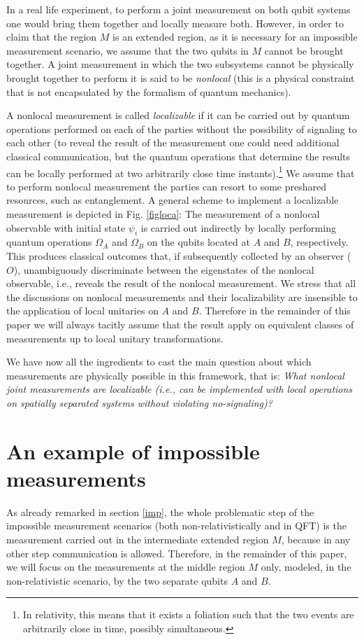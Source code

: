 \documentclass[a4paper,twocolumn,11pt,accepted=2024-02-14]{quantumarticle}
\begin{document}
In a real life experiment, to perform a joint measurement on both qubit systems one would bring them together and locally measure both. However,  in order to claim that the region $M$   is an extended region, as it is necessary for an impossible measurement scenario, we assume that the two qubits in $M$ cannot be brought together. A joint measurement in which the two subsystems cannot be physically brought together to perform it is said to be  \textit{nonlocal} (this is a physical constraint that is not encapsulated by the formalism of quantum mechanics). 

A nonlocal measurement is called \textit{localizable} if it can be carried out  by quantum operations performed on each of the parties without the possibility of signaling to each other (to reveal the result of the measurement one could need additional  classical communication, but the quantum operations that determine the results can be locally performed at two arbitrarily close time instants).\footnote{In relativity, this means that it exists a foliation such that the two events are arbitrarily close in time, possibly simultaneous.} We assume that to perform nonlocal measurement the parties can resort to some preshared resources, such as entanglement. A general scheme to implement a localizable measurement is depicted in Fig. \ref{figloca}: The measurement of a nonlocal observable with initial state $\psi_i$ is carried out indirectly by locally performing quantum operations $\Omega_{A}$ and $\Omega_{B}$ on the qubits located at $A$ and $B$, respectively. This produces classical outcomes that, if subsequently collected by an observer ($O$), unambiguously discriminate between the eigenstates of the nonlocal observable, i.e., reveals the result of the nonlocal measurement. 
We stress that all the discussions on nonlocal measurements and their localizability are insensible to the application of local unitaries on $A$ and $B$. Therefore in the remainder of this paper we will always tacitly assume that the result apply on equivalent classes of measurements up to local unitary transformations.


We have now all the ingredients to cast the main question about which measurements are physically possible in this framework, that is: 
\textit{What nonlocal joint measurements are localizable (i.e., can be implemented with local operations on spatially separated systems without violating no-signaling)?
}


\section{An example of impossible measurements}
\label{example}
As already remarked in section \ref{imp}, the whole problematic step of the impossible measurement scenarios (both non-relativistically and in QFT) is the measurement carried out in the intermediate extended region $M$, because in any other step communication is allowed. Therefore, in the remainder of this paper, we will focus on the measurements at the middle region $M$ only, modeled, in the non-relativistic scenario,  by the  two separate qubits $A$ and $B$.
\end{document}
